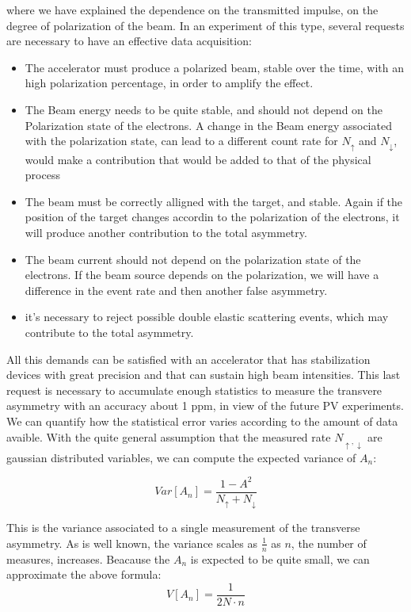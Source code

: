 where we have explained the dependence on the transmitted impulse, on the degree of polarization of the beam.
In an experiment of this type, several requests are necessary to have an effective data acquisition:

\begin{itemize}
\item The accelerator must produce a polarized beam, stable over the time, with an high polarization percentage, in order to amplify the effect.
\item The Beam energy needs to be quite stable, and should not depend on the Polarization state of the electrons. A change in the Beam energy associated with the polarization state, can lead to a different count rate for $N_{\uparrow}$ and $N_{\downarrow}$, would make a contribution that would be added to that of the physical process
\item The beam must be correctly alligned with the target, and stable. Again if the position of the target changes accordin to the polarization of the electrons, it will produce another contribution to the total asymmetry.
\item The beam current should not depend on the polarization state of the electrons. If the beam source depends on the polarization, we will have a difference in the event rate and then another false asymmetry.
\item it's necessary to reject possible double elastic scattering events, which may contribute to the total asymmetry. 
\end{itemize}

All this demands can be satisfied with an accelerator that has stabilization devices with great precision and that can sustain high beam intensities. This last request is necessary to accumulate enough statistics to measure the transvere asymmetry with an accuracy about 1 ppm, in view of the future PV experiments. We can quantify how the statistical error varies according to the amount of data avaible. With the quite general assumption that the measured rate $N_{\uparrow,\downarrow}$ are gaussian distributed variables, we can compute the expected variance of $A_{n}$:

\begin{equation}
Var[A_{n}] = \dfrac{1 - A^{2}}{N_{\uparrow} + N_{\downarrow}} 
\end{equation}

This is the variance associated to a single measurement of the transverse asymmetry. As is well known, the variance scales as $\frac{1}{n}$ as $n$, the number of measures, increases.
Beacause the $A_{n}$ is expected to be quite small, we can approximate the above formula:
\begin{equation} \label{eq:Error}
V[A_{n}] = \dfrac{1}{2N \cdot n}
\end{equation}

